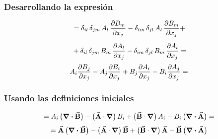 \documentclass[12pt]{beamer}
\begin{document}
\begin{frame}
\frametitle{Desarrollando la expresión}
\begin{align*}
&= \delta_{il} \, \delta_{jm} \, A_{l} \, \pdv{B_{m}}{x_{j}} - \delta_{im} \, \delta_{jl} \, A_{l} \, \pdv{B_{m}}{x_{j}} + \\[0.5em] 
&+ \delta_{il} \, \delta_{jm} \, B_{m} \, \pdv{A_{l}}{x_{j}} - \delta_{im} \, \delta_{jl} \, B_{m} \, \pdv{A_{l}}{x_{j}} =
\end{align*}
\pause
\begin{align*}
A_{i} \pdv{B_{j}}{x_{j}} - A_{j} \pdv{B_{i}}{x_{j}} + B_{j} \pdv{A_{i}}{x_{j}} - B_{i} \pdv{A_{j}}{x_{j}} =
\end{align*}
\end{frame}
\begin{frame}
\frametitle{Usando las definiciones iniciales}
\fontsize{12}{12}\selectfont
\begin{align*}
= A_{i} \, \big( \div{\va{B}} \big) - \big( \va{A} \cdot \grad \big) \, B_{i} + \big( \va{B} \cdot \grad \big) \, A_{i} - B_{i} \, \big( \div{\va{A}} \big) =
\end{align*}
\pause
\begin{align*}
= \va{A} \, \big( \div{\va{B}} \big) - \big( \va{A} \cdot \grad \big) \, \va{B} + \big( \va{B} \cdot \grad \big) \, \va{A} - \va{B} \, \big( \div{\va{A}} \big)
\end{align*}
\end{frame}
\end{document}
